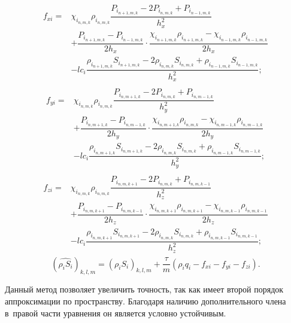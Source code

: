 \begin{eqnarray*}
  \begin{aligned}
    f_{xi} =& \chi_{i_{n,m,k}} \rho_{i_{n,m,k}} \dfrac{P_{i_{n+1,m,k}} - 2P_{i_{n,m,k}} + P_{i_{n-1,m,k}}}{h_x^2} \\
    &+ \dfrac{P_{i_{n+1,m,k}}-P_{i_{n-1,m,k}}}{2h_x} \cdot \dfrac{\chi_{i_{n+1,m,k}} \rho_{i_{n+1,m,k}}-\chi_{i_{n-1,m,k}} \rho_{i_{n-1,m,k}}}{2h_x} \\
    &- lc_i\dfrac{\rho_{i_{n+1,m,k}}S_{i_{n+1,m,k}} - 2\rho_{i_{n,m,k}}S_{i_{n,m,k}} + \rho_{i_{n-1,m,k}}S_{i_{n-1,m,k}}}{h_x^2};
  \end{aligned}
\end{eqnarray*}
\begin{eqnarray*}
  \begin{aligned}
    f_{yi} =& \chi_{i_{n,m,k}} \rho_{i_{n,m,k}} \dfrac{P_{i_{n,m+1,k}} - 2P_{i_{n,m,k}} + P_{i_{n,m-1,k}}}{h_y^2} \\
    &+ \dfrac{P_{i_{n,m+1,k}}-P_{i_{n,m-1,k}}}{2h_y} \cdot \dfrac{\chi_{i_{n,m+1,k}} \rho_{i_{n,m,k}}-\chi_{i_{n,m-1,k}} \rho_{i_{n,m-1,k}}}{2h_y} \\
    &- lc_i\dfrac{\rho_{i_{n,m+1,k}}S_{i_{n,m+1,k}} - 2\rho_{i_{n,m,k}}S_{i_{n,m,k}} + \rho_{i_{n,m-1,k}}S_{i_{n,m-1,k}}}{h_y^2};
  \end{aligned}
    \end{eqnarray*}
\begin{eqnarray*}
  \begin{aligned}
    f_{zi} =& \chi_{i_{n,m,k}} \rho_{i_{n,m,k}} \dfrac{P_{i_{n,m,k+1}} - 2P_{i_{n,m,k}} + P_{i_{n,m,k-1}}}{h_z^2} \\
    &+ \dfrac{P_{i_{n,m,k+1}}-P_{i_{n,m,k-1}}}{2h_z} \cdot \dfrac{\chi_{i_{n,m,k+1}} \rho_{i_{n,m,k+1}}-\chi_{i_{n,m,k-1}} \rho_{i_{n,m,k-1}}}{2h_z} \\
    &- lc_i\dfrac{\rho_{i_{n,m,k+1}}S_{i_{n,m,k+1}} - 2\rho_{i_{n,m,k}}S_{i_{n,m,k}} + \rho_{i_{n,m,k-1}}S_{i_{n,m,k-1}}}{h_z^2};
  \end{aligned}
\end{eqnarray*}
\begin{equation*}
    (\widehat{\rho_i S_i})_{k,l,m}=(\rho_i S_i)_{k,l,m}+\frac{\tau}{m}(\rho_i q_i - f_{xi} - f_{yi} - f_{zi}).
\end{equation*}

Данный метод позволяет увеличить точность, так как имеет второй порядок аппроксимации по пространству.
Благодаря наличию дополнительного члена в~правой
части уравнения он является условно устойчивым.

